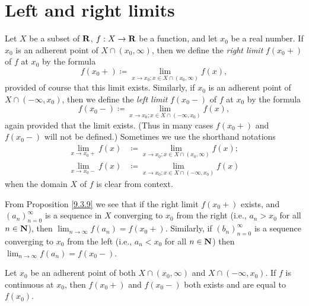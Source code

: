 \section{Left and right limits}\label{sec 9.5}

\begin{definition}\label{9.5.1}
    Let \(X\) be a subset of \(\mathbf{R}\), \(f : X \to \mathbf{R}\) be a function, and let \(x_0\) be a real number.
    If \(x_0\) is an adherent point of \(X \cap (x_0, \infty)\), then we define the \emph{right limit} \(f(x_0+)\) of \(f\) at \(x_0\) by the formula
    \[
        f(x_0+) \coloneqq \lim_{x \to x_0 ; x \in X \cap (x_0, \infty)} f(x),
    \]
    provided of course that this limit exists.
    Similarly, if \(x_0\) is an adherent point of \(X \cap (-\infty, x_0)\), then we define the \emph{left limit} \(f(x_0-)\) of \(f\) at \(x_0\) by the formula
    \[
        f(x_0-) \coloneqq \lim_{x \to x_0 ; x \in X \cap (-\infty, x_0)} f(x),
    \]
    again provided that the limit exists.
    (Thus in many cases \(f(x_0+)\) and \(f(x_0-)\) will not be defined.)
    Sometimes we use the shorthand notations
    \begin{align*}
        \lim_{x \to x_0+} f(x) & \coloneqq \lim_{x \to x_0 ; x \in X \cap (x_0, \infty)} f(x); \\
        \lim_{x \to x_0-} f(x) & \coloneqq \lim_{x \to x_0 ; x \in X \cap (-\infty, x_0)} f(x)
    \end{align*}
    when the domain \(X\) of \(f\) is clear from context.
\end{definition}

\begin{note}
    From Proposition \ref{9.3.9} we see that if the right limit \(f(x_0+)\) exists, and \((a_n)_{n = 0}^\infty\) is a sequence in \(X\) converging to \(x_0\) from the right (i.e., \(a_n > x_0\) for all \(n \in \mathbf{N}\)), then \(\lim_{n \to \infty} f(a_n) = f(x_0+)\).
    Similarly, if \((b_n)_{n = 0}^\infty\) is a sequence converging to \(x_0\) from the left (i.e., \(a_n < x_0\) for all \(n \in \mathbf{N}\)) then \(\lim_{n \to \infty} f(a_n) = f(x_0-)\).
\end{note}

\begin{additional corollary}\label{ac 9.5.1}
Let \(x_0\) be an adherent point of both \(X \cap (x_0, \infty)\) and \(X \cap (-\infty, x_0)\).
If \(f\) is continuous at \(x_0\), then \(f(x_0+)\) and \(f(x_0-)\) both exists and are equal to \(f(x_0)\).
\end{additional corollary}


